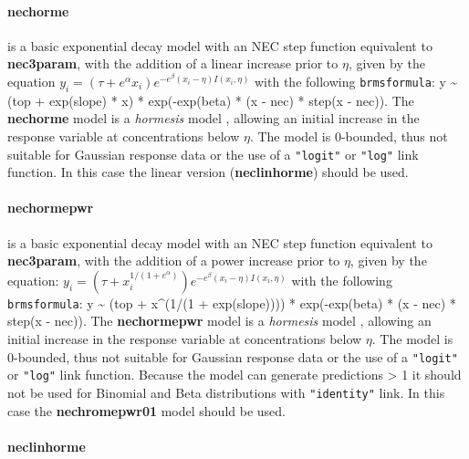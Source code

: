 \documentclass[
  shortnames]{jss}
\begin{document}
\hypertarget{nechorme}{%
\paragraph{nechorme}\label{nechorme}}

is a basic exponential decay model with an NEC step function equivalent to \textbf{nec3param}, with the addition of a linear increase prior to \(\eta\), given by the equation
\(y_i = (\tau + e^{\alpha} x_i) e^{-e^{\beta} \left(x_i - \eta \right) I(x_i, \eta)}\)
with the following \texttt{brmsformula}: y \textasciitilde{} (top + exp(slope) * x) * exp(-exp(beta) * (x - nec) * step(x - nec)). The \textbf{nechorme} model is a \emph{hormesis} model \citep{Mattson2008}, allowing an initial increase in the response variable at concentrations below \(\eta\). The model is 0-bounded, thus not suitable for Gaussian response data or the use of a \texttt{"logit"} or \texttt{"log"} link function. In this case the linear version (\textbf{neclinhorme}) should be used.

\hypertarget{nechormepwr}{%
\paragraph{nechormepwr}\label{nechormepwr}}

is a basic exponential decay model with an NEC step function equivalent to \textbf{nec3param}, with the addition of a power increase prior to \(\eta\), given by the equation:
\(y_i = (\tau + x_i^{1/(1+e^{\alpha})}) e^{-e^{\beta} \left(x_i - \eta \right) I(x_i, \eta)}\)
with the following \texttt{brmsformula}: y \textasciitilde{} (top + x\^{}(1/(1 + exp(slope)))) * exp(-exp(beta) * (x - nec) * step(x - nec)). The \textbf{nechormepwr} model is a \emph{hormesis} model \citep{Mattson2008}, allowing an initial increase in the response variable at concentrations below \(\eta\). The model is 0-bounded, thus not suitable for Gaussian response data or the use of a \texttt{"logit"} or \texttt{"log"} link function. Because the model can generate predictions \textgreater{} 1 it should not be used for Binomial and Beta distributions with \texttt{"identity"} link. In this case the \textbf{nechromepwr01} model should be used.

\hypertarget{neclinhorme}{%
\paragraph{neclinhorme}\label{neclinhorme}}
\end{document}
